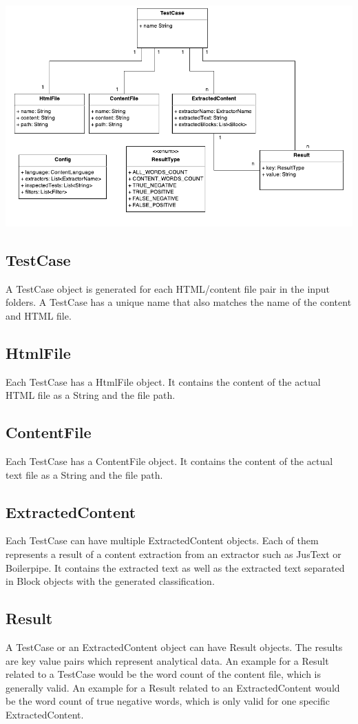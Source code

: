 \includegraphics[width=14cm]{Figures/dataModel.pdf}


\subsection{TestCase}
A TestCase object is generated for each HTML/content file pair in the input folders. A TestCase has a unique  name that also matches the name of the content and HTML file.

\subsection{HtmlFile}
Each TestCase has a HtmlFile object. It contains the content of the actual HTML file as a String and the file path.

\subsection{ContentFile}
Each TestCase has a ContentFile object. It contains the content of the actual text file as a String and the file path.

\subsection{ExtractedContent}
Each TestCase can have multiple ExtractedContent objects. Each of them represents a result of a content extraction from an extractor such as JusText or Boilerpipe. It contains the extracted text as well as the extracted text separated in Block objects with the generated classification.

\subsection{Result}
A TestCase or an ExtractedContent object can have Result objects. The results are key value pairs which represent analytical data. An example for a Result related to a TestCase would be the word count of the content file, which is generally valid. An example for a Result related to an ExtractedContent would be the word count of true negative words, which is only valid for one specific ExtractedContent.

